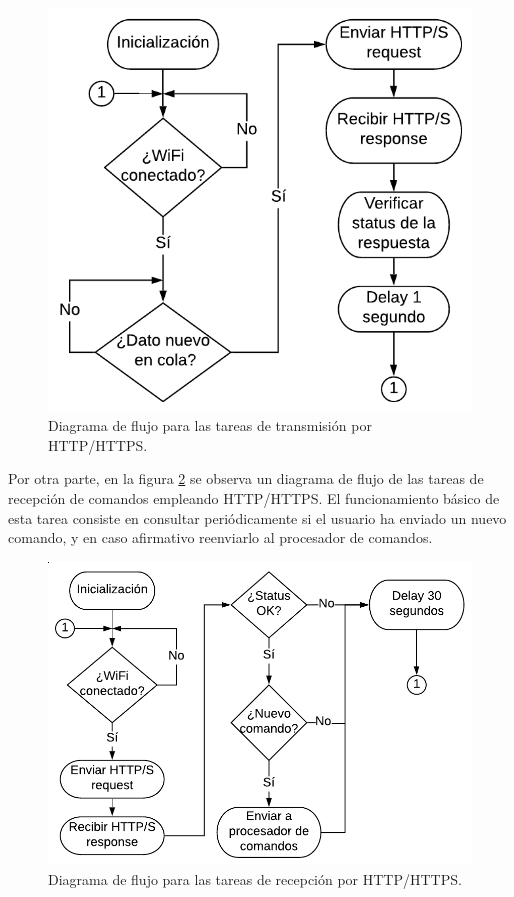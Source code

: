 \begin{figure}[h!]
\centering
\includegraphics[scale=0.75]{./Figures/http_tx_task_diagram.pdf}
\caption{Diagrama de flujo para las tareas de transmisión por HTTP/HTTPS.}
\label{fig:http_tx_task_diagram}
\end{figure}

Por otra parte, en la figura \ref{fig:http_rx_task_diagram} se observa un diagrama de flujo de las tareas de recepción de comandos empleando HTTP/HTTPS. El funcionamiento básico de esta tarea consiste en consultar periódicamente si el usuario ha enviado un nuevo comando, y en caso afirmativo reenviarlo al procesador de comandos.

\begin{figure}[h!]
\centering
\includegraphics[scale=0.75]{./Figures/http_rx_task_diagram.pdf}
\caption{Diagrama de flujo para las tareas de recepción por HTTP/HTTPS.}
\label{fig:http_rx_task_diagram}
\end{figure}


